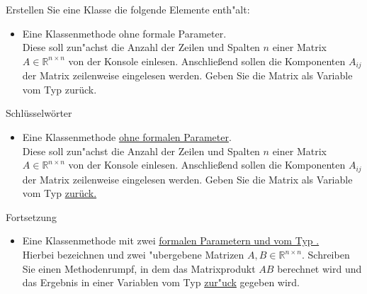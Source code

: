 \documentclass[c,18pt]{beamer}
\begin{document}
\begin{frame}
Erstellen Sie eine Klasse  die folgende Elemente enth"alt:
\begin{itemize}
  \item Eine Klassenmethode  ohne formale Parameter.\\
  Diese soll zun"achst die Anzahl der Zeilen und Spalten $n$ einer Matrix $A\in\mathbb R^{n \times n}$ von
  der Konsole einlesen. Anschlie\ss end sollen die Komponenten $A_{ij}$ der Matrix zeilenweise eingelesen
  werden. Geben Sie die Matrix als Variable vom Typ  zur\"uck.
\end{itemize}
\end{frame}

\begin{frame}
Schl\"usselw\"orter
\begin{itemize}
  \item Eine Klassenmethode  \underline{ohne formalen Parameter}.\\
  Diese soll zun"achst die Anzahl der Zeilen und Spalten $n$ einer Matrix $A\in\mathbb R^{n \times n}$ von
  der Konsole einlesen. Anschlie\ss end sollen die Komponenten $A_{ij}$ der Matrix zeilenweise eingelesen
  werden. Geben Sie die Matrix als Variable vom Typ \underline{ zur\"uck.}
\end{itemize}
\end{frame}


\begin{frame}
Fortsetzung
\begin{itemize}
  \item Eine Klassenmethode  mit zwei \underline{formalen Parametern  und 
  vom Typ .}\\
  Hierbei bezeichnen  und  zwei "ubergebene Matrizen
  $A,B\in\mathbb R^{n\times n}$. Schreiben Sie einen Methodenrumpf, in dem das Matrixprodukt $AB$ berechnet
  wird und das Ergebnis in einer Variablen vom Typ \underline{ zur"uck} gegeben wird.
\end{itemize}
\end{frame}
\end{document}
